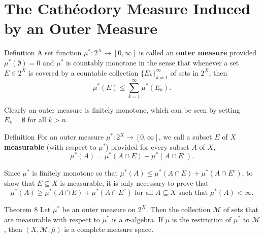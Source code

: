 \section{The Cath\'eodory Measure Induced by an Outer Measure}
\begin{namedthm*}{Definition}
	A set function $\mu^*:2^X\to[0,\infty]$ is called an \textbf{outer measure} provided $\mu^*(\emptyset)=0$ and $\mu^*$ is countably monotone in the sense that whenever a set $E\in2^X$ is covered by a countable collection $\{E_k\}_{k=1}^\infty$ of sets in $2^X$, then
	\[
		\mu^*(E)\le\sum_{k=1}^\infty\mu^*(E_k).
	\]
\end{namedthm*}
Clearly an outer measure is finitely monotone, which can be seen by setting $E_k=\emptyset$ for all $k>n$.
\begin{namedthm*}{Definition}
	For an outer measure $\mu^*:2^X\to[0,\infty]$, we call a subset $E$ of $X$ \textbf{measurable} (with respect to $\mu^*$) provided for every subset $A$ of $X$,
	\[
		\mu^*(A)=\mu^*(A\cap E)+\mu^*(A\cap E^c).
	\]
\end{namedthm*}
Since $\mu^*$ is finitely monotone so that $\mu^*(A)\le\mu^*(A\cap E)+\mu^*(A\cap E^c)$, to show that $E\subseteq X$ is measurable, it is only necessary to prove that
\[
	\mu^*(A)\ge\mu^*(A\cap E)+\mu^*(A\cap E^c)\text{ for all }A\subseteq X\text{ such that }\mu^*(A)<\infty.
\]
\begin{namedthm*}{Theorem 8}
	Let $\mu^*$ be an outer measure on $2^X$.
	Then the collection $\mathcal{M}$ of sets that are measurable with respect to $\mu^*$ is a $\sigma$-algebra.
	If $\overline{\mu}$ is the restriction of $\mu^*$ to $\mathcal{M}$, then $(X,\mathcal{M},\overline{\mu})$ is a complete measure space.
\end{namedthm*}


